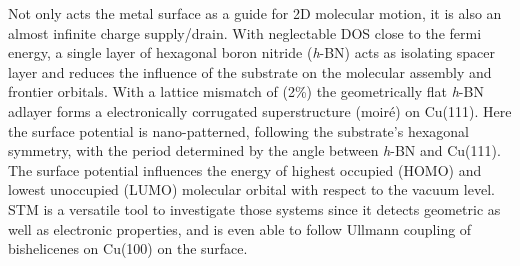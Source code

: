 Not only acts the metal surface as a guide for 2D molecular motion, it is also an almost infinite charge supply/drain. With neglectable DOS close to the fermi energy, a single layer of hexagonal boron nitride (\textit{h}-BN) acts as isolating spacer layer and reduces the influence of the substrate on the molecular assembly and frontier orbitals.\cite{urgel_controlling_2015, Sushobhan_Control_2014, Schulz_Templated_2013} With a lattice mismatch of (2\%)\cite{joshi_boron_2012, preobrajenski_monolayer_2005} the geometrically flat\cite{schwarz_corrugation_2017} \textit{h}-BN adlayer forms a electronically corrugated superstructure (moir\'e) on Cu(111).\cite{joshi_boron_2012} Here the surface potential is nano-patterned\cite{joshi_boron_2012}, following the substrate’s hexagonal symmetry, with the period determined by the angle between \textit{h}-BN and Cu(111)\cite{hermann_periodic_2012}. The surface potential influences the energy of highest occupied (HOMO) and lowest unoccupied (LUMO) molecular orbital with respect to the vacuum level.\cite{Sushobhan_Control_2014, Fernandez_Spectroscopy_2008} STM is a versatile tool to investigate those systems since it detects geometric as well as electronic properties, and is even able to follow Ullmann coupling of bishelicenes on Cu(100)\cite{Waeckerlin_Surface-assisted_2016} on the surface. 

